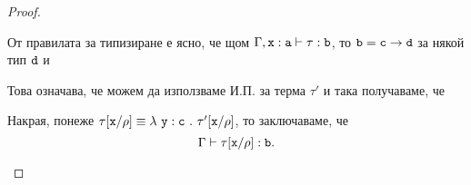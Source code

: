 \begin{proof}
\begin{itemize}
    От правилата за типизиране е ясно, че щом $\Gamma, \type{x}{a} \vdash \tau : \vv{b}$, то
    $\vv{b} = \vv{c} \to \vv{d}$ за някой тип $\vv{d}$ и
    \begin{prooftree}
    \end{prooftree}
    Това означава, че можем да използваме И.П. за терма $\tau'$ и така получаваме, че
    \begin{prooftree}
    \end{prooftree}
    Накрая, понеже $\tau\subst{x}{\rho} \equiv \lamb{y}{c}{\tau'\subst{x}{\rho}}$, то
    заключаваме, че
    \[\Gamma \vdash \tau\subst{x}{\rho}:\vv{b}.\]


\end{itemize}
\end{proof}
